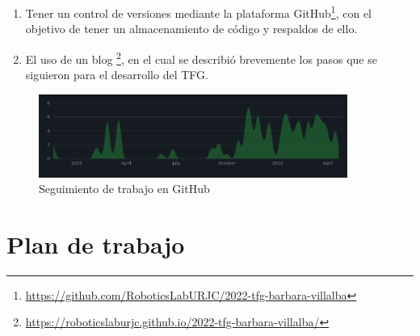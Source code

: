 \begin{enumerate}
    \item Tener un control de versiones mediante la plataforma GitHub\footnote{\url{https://github.com/RoboticsLabURJC/2022-tfg-barbara-villalba}}, con el objetivo de tener un almacenamiento de código y respaldos de ello.  
    \item El uso de un blog \footnote{\url{https://roboticslaburjc.github.io/2022-tfg-barbara-villalba/}}, en el cual se describió brevemente los pasos que se siguieron para el desarrollo del TFG.
\end{enumerate}

\begin{figure} [H]
    \begin{center}
      \includegraphics[width=0.9\textwidth,height=0.3\textwidth]{figs/objetivos/github.png}
    \end{center}
    \caption{Seguimiento de trabajo en GitHub}
    \label{fig:github}
  \end{figure}


\section{Plan de trabajo}
\label{sec:plantrabajo}

